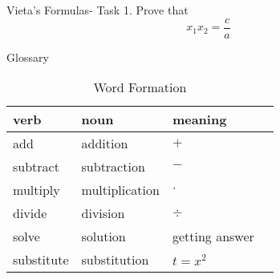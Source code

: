 \documentclass[final]{beamer}
\newlength{\onecolwid}
\begin{document}
\begin{frame}[t]
\begin{columns}[t]
\begin{column}{\onecolwid}
                  \begin{block}{Vieta's Formulas- Task}
                    1. Prove that $$x_1x_2 = \frac{c}{a}$$
                    \[\]
                    \[\]
                    \[\]
                    \[\]
                    \[\]
                    
                    \end{block}
                    
                    
                    
                    
                    \begin{block}{Glossary}
                    
                    \begin{table}
                    \vspace{2ex}
                    \begin{tabular}{l l l l}
                    \toprule
                    \textbf{verb} & \textbf{noun} & \textbf{meaning}\\
                    \midrule
                    add & addition & $+$ \\
                    subtract & subtraction & $-$ \\
                    multiply & multiplication & $\cdot$ \\
                    divide & division & $\div$ \\
                    solve & solution & getting answer \\
                    substitute & substitution & $t=x^2$ \\
                    
                    
                    
                    \bottomrule
                    \end{tabular}
                    \caption{Word Formation}
                    \end{table}
                    
                    
                    \end{block}
                    

\end{column}
\end{columns}
\end{frame}
\end{document}
